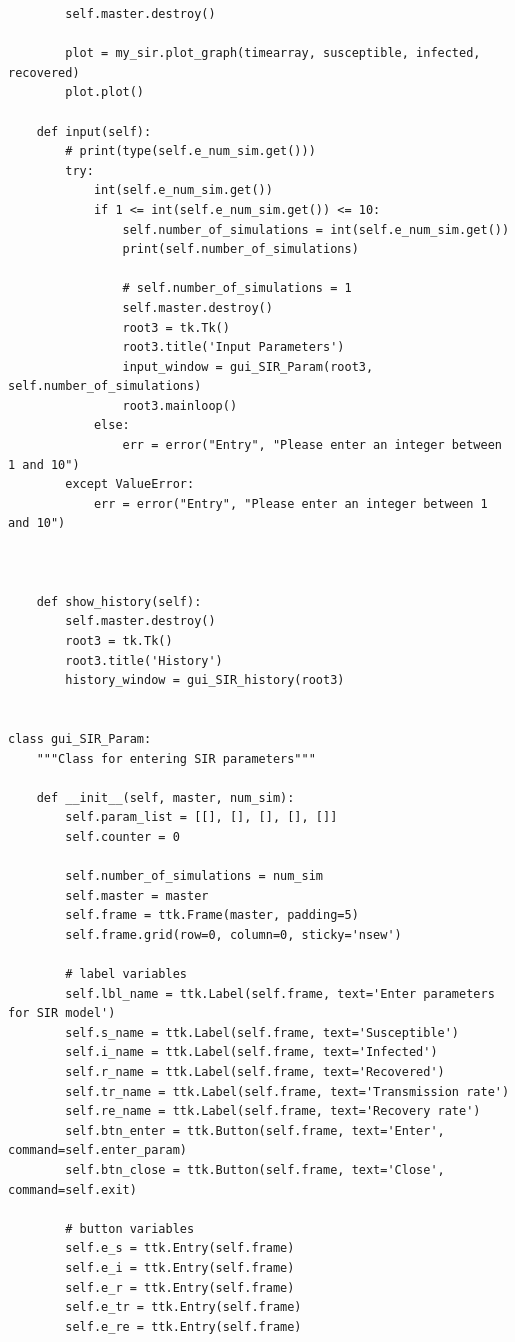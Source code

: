 \documentclass[11pt, a4paper]{article}
\begin{document}
\begin{lstlisting}
        self.master.destroy()

        plot = my_sir.plot_graph(timearray, susceptible, infected, recovered)
        plot.plot()

    def input(self):
        # print(type(self.e_num_sim.get()))
        try:
            int(self.e_num_sim.get())
            if 1 <= int(self.e_num_sim.get()) <= 10:
                self.number_of_simulations = int(self.e_num_sim.get())
                print(self.number_of_simulations)

                # self.number_of_simulations = 1
                self.master.destroy()
                root3 = tk.Tk()
                root3.title('Input Parameters')
                input_window = gui_SIR_Param(root3, self.number_of_simulations)
                root3.mainloop()
            else:
                err = error("Entry", "Please enter an integer between 1 and 10")
        except ValueError:
            err = error("Entry", "Please enter an integer between 1 and 10")



    def show_history(self):
        self.master.destroy()
        root3 = tk.Tk()
        root3.title('History')
        history_window = gui_SIR_history(root3)


class gui_SIR_Param:
    """Class for entering SIR parameters"""

    def __init__(self, master, num_sim):
        self.param_list = [[], [], [], [], []]
        self.counter = 0

        self.number_of_simulations = num_sim
        self.master = master
        self.frame = ttk.Frame(master, padding=5)
        self.frame.grid(row=0, column=0, sticky='nsew')

        # label variables
        self.lbl_name = ttk.Label(self.frame, text='Enter parameters for SIR model')
        self.s_name = ttk.Label(self.frame, text='Susceptible')
        self.i_name = ttk.Label(self.frame, text='Infected')
        self.r_name = ttk.Label(self.frame, text='Recovered')
        self.tr_name = ttk.Label(self.frame, text='Transmission rate')
        self.re_name = ttk.Label(self.frame, text='Recovery rate')
        self.btn_enter = ttk.Button(self.frame, text='Enter', command=self.enter_param)
        self.btn_close = ttk.Button(self.frame, text='Close', command=self.exit)

        # button variables
        self.e_s = ttk.Entry(self.frame)
        self.e_i = ttk.Entry(self.frame)
        self.e_r = ttk.Entry(self.frame)
        self.e_tr = ttk.Entry(self.frame)
        self.e_re = ttk.Entry(self.frame)


\end{lstlisting}
\end{document}
